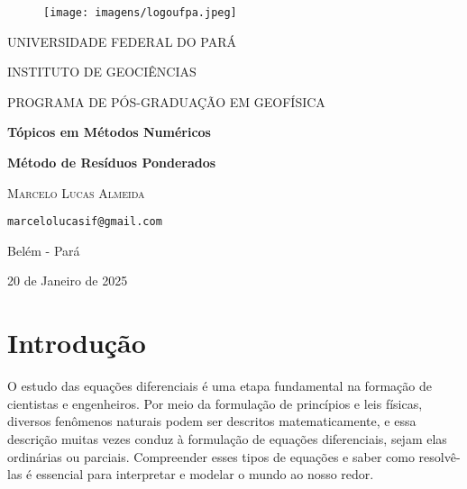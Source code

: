 \documentclass[a4paper, 12pt]{article}
\numberwithin{equation}{section}
\begin{document}
\begin{titlepage}
	\begin{center}
		\begin{figure}[!htp]
			\centering
			\texttt{[image: imagens/logoufpa.jpeg]}
		\end{figure}
	\vspace{0.5cm}
	
	{\Large UNIVERSIDADE FEDERAL DO PARÁ} 
	\vspace{0.5cm}
	
	{\Large INSTITUTO DE GEOCIÊNCIAS} 
	\vspace{0.5cm}
	
		{\Large PROGRAMA DE PÓS-GRADUAÇÃO EM GEOFÍSICA}
	
	\vspace{2cm}
	
	{\Large \textbf{Tópicos em Métodos Numéricos }}

    \vspace{0.5cm}

    {\large \textbf{Método de Resíduos Ponderados}}
	
	\vspace{1cm}
	
	{\textsc{Marcelo Lucas Almeida}}

    \vspace{2cm}

    {\texttt{marcelolucasif@gmail.com}}
	

\vspace{2cm}

	Belém - Pará  \\ 
	
	\vspace{0.5cm}
	
	20 de Janeiro de 2025

	
	
	\end{center}




\end{titlepage}
    



\tableofcontents  %
\newpage         %

\section{Introdução}
O estudo das equações diferenciais é uma etapa fundamental na formação de cientistas e engenheiros. Por meio da formulação de princípios e leis físicas, diversos fenômenos naturais podem ser descritos matematicamente, e essa descrição muitas vezes conduz à formulação de equações diferenciais, sejam elas ordinárias ou parciais. Compreender esses tipos de equações e saber como resolvê-las é essencial para interpretar e modelar o mundo ao nosso redor.
\end{document}
